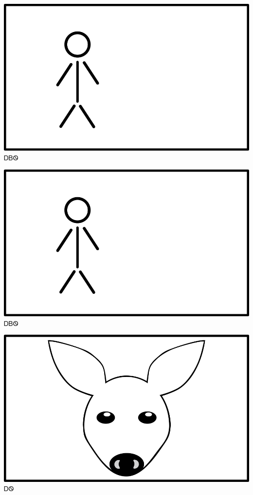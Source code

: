 \documentclass[avery5371]{flashcards}%
\begin{document}
\begin{flashcard}{
\includegraphics[width=0.95\columnwidth,height=.51\columnwidth,keepaspectratio]{../artwork/flags/ayvwi-no-flag}
}
\Huge ᎠᏴᏫ
\end{flashcard}

\begin{flashcard}{
\includegraphics[width=0.95\columnwidth,height=.51\columnwidth,keepaspectratio]{../artwork/flags/ayvwi-no-flag}
}
\Huge ᎠᏴᏫ
\end{flashcard}


\begin{flashcard}{
\includegraphics[width=0.95\columnwidth,height=.51\columnwidth,keepaspectratio]{../artwork/objects-animate/ahwi}
}
\Huge ᎠᏫ
\end{flashcard}
\end{document}
